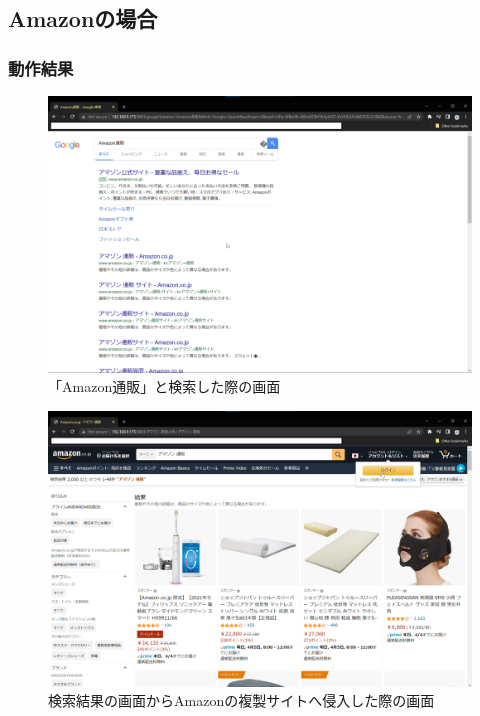 \documentclass[dvipdfmx]{jsarticle}
\begin{document}
            \subsection{Amazonの場合}
                \subsubsection{動作結果}
                    \begin{figure}[pth]
                        \centering
                        \includegraphics[width=15cm]{img/amazon/amazon-00.png}
                        \caption{「Amazon通販」と検索した際の画面}
                        \label{amazon-00}
                    \end{figure}
                    \begin{figure}[pth]
                        \centering
                        \includegraphics[width=15cm]{img/amazon/amazon-01.png}
                        \caption{検索結果の画面からAmazonの複製サイトへ侵入した際の画面}
                        \label{amazon-01}
                    \end{figure}
\end{document}
